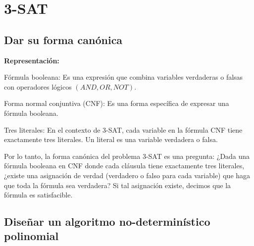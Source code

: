 \section{3-SAT}

\subsection{Dar su forma canónica}

\textbf{Representación:}

\begin{myitemize}
    \item Fórmula booleana: Es una expresión que combina variables verdaderas o falsas con operadores 
            lógicos $(AND, OR, NOT)$.
    \item Forma normal conjuntiva (CNF): Es una forma específica de expresar una fórmula booleana. 
    \item Tres literales: En el contexto de 3-SAT, cada variable en la fórmula CNF tiene exactamente tres 
            literales. Un literal es una variable verdadera o falsa.
\end{myitemize}

Por lo tanto, la forma canónica del problema 3-SAT es una pregunta: ¿Dada una fórmula booleana en CNF donde cada 
cláusula tiene exactamente tres literales, ¿existe una asignación de verdad (verdadero o falso para cada variable) 
que haga que toda la fórmula sea verdadera? Si tal asignación existe, decimos que la fórmula es satisfacible.

\subsection{Diseñar un algoritmo no-determinístico polinomial}

